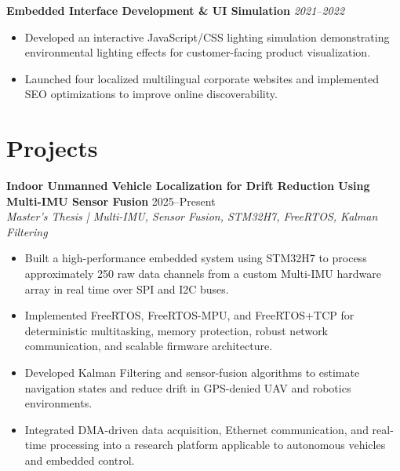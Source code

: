 \documentclass[a4paper,10pt]{article}
\newcommand{\projectheading}[2]{%
  \vspace{4pt}\noindent\textbf{#1} \hfill \textit{\small #2}\\%
}
\begin{document}
\projectheading{Embedded Interface Development \& UI Simulation}{2021--2022}
\begin{itemize}
  \item Developed an interactive JavaScript/CSS lighting simulation demonstrating
        environmental lighting effects for customer-facing product visualization.
  \item Launched four localized multilingual corporate websites and implemented SEO
        optimizations to improve online discoverability.
\end{itemize}

\section*{Projects}

\textbf{Indoor Unmanned Vehicle Localization for Drift Reduction Using Multi-IMU Sensor Fusion}
\hfill 2025--Present\\
\textit{Master's Thesis | Multi-IMU, Sensor Fusion, STM32H7, FreeRTOS, Kalman Filtering}
\begin{itemize}
  \item Built a high-performance embedded system using STM32H7 to process approximately
        250 raw data channels from a custom Multi-IMU hardware array in real time over
        SPI and I2C buses.
  \item Implemented FreeRTOS, FreeRTOS-MPU, and FreeRTOS+TCP for deterministic
        multitasking, memory protection, robust network communication, and scalable
        firmware architecture.
  \item Developed Kalman Filtering and sensor-fusion algorithms to estimate navigation
        states and reduce drift in GPS-denied UAV and robotics environments.
  \item Integrated DMA-driven data acquisition, Ethernet communication, and real-time
        processing into a research platform applicable to autonomous vehicles and embedded
        control.
\end{itemize}
\end{document}
